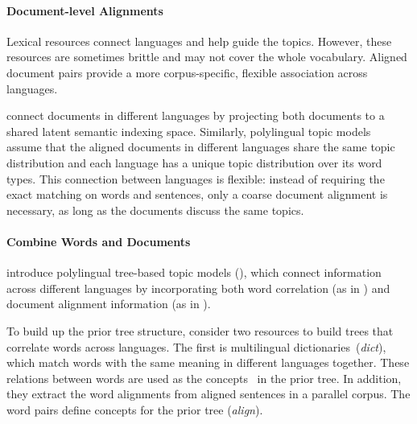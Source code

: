 \paragraph{\bf Document-level Alignments}

Lexical resources connect languages and help guide the topics. However, these resources are sometimes brittle and may not cover the whole vocabulary.  Aligned document pairs provide a more corpus-specific, flexible association across languages.

\citet{Landauer-1990} connect documents in different languages by projecting both documents to a shared latent semantic indexing space. Similarly, 
polylingual topic models~\citep{mimno-09} assume that the aligned documents in different languages share the same topic distribution and each language has a unique topic distribution over its word types.  This connection between languages is flexible: instead of requiring the exact matching on words and sentences, only a coarse document alignment is necessary, as long as the documents discuss the same topics.

\paragraph{\bf Combine Words and Documents}

\citet{hu-14} introduce polylingual tree-based topic models (\ptlda{}), which connect information across different languages by incorporating both
word correlation (as in \tlda{}) and document alignment information (as in \plda{}). 

To build up the prior tree structure, \citet{hu-14} consider two resources to build trees that correlate words across languages. The first is multilingual dictionaries~(\textit{dict}), which match words with the same meaning in different languages together.  These relations between words are used as the concepts~\citep{Bhattacharya-2006} in the prior tree.%
In addition, they extract the word alignments from aligned sentences in a parallel corpus.  The word pairs define concepts for the prior tree (\textit{align}). 


